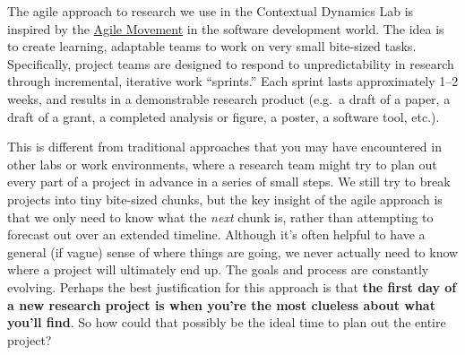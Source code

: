 \documentclass{tufte-book} %
\begin{document}

\noindent The agile approach to research we use in the Contextual
Dynamics Lab is inspired by the
\href{http://scrumtrainingseries.com/}{Agile Movement} in the software
development world.  The idea is to create learning, adaptable teams to
work on very small bite-sized tasks.  Specifically, project teams are
designed to respond to unpredictability in research through
incremental, iterative work ``sprints.''  Each sprint lasts
approximately 1--2 weeks, and results in a demonstrable research
product (e.g.\ a draft of a paper, a draft of a grant, a completed
analysis or figure, a poster, a software tool, etc.).

This is different from traditional approaches that you may have
encountered in other labs or work environments, where a research team
might try to plan out every part of a project in advance in a series
of small steps.  We still try to break projects into tiny bite-sized
chunks, but the key insight of the agile approach is that we only need
to know what the \textit{next} chunk is, rather than attempting to
forecast out over an extended timeline.  Although it's often helpful
to have a general (if vague) sense of where things are going, we never
actually need to know where a project will ultimately end up.  The
goals and process are constantly evolving.  Perhaps the best
justification for this approach is that \textbf{the first day of a new
  research project is when you're the most clueless about what you'll
  find}.  So how could that possibly be the ideal time to plan out the
entire project?
\end{document}
